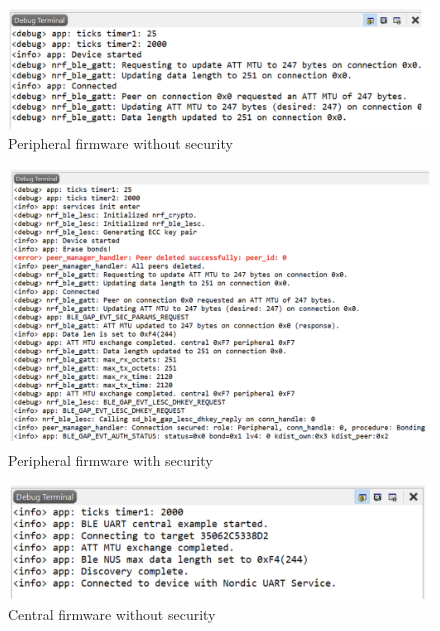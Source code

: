 \documentclass{Configuration_Files/PoliMi3i_thesis}
\begin{document}
\begin{figure}[h]
    \centering
    \includegraphics[scale=0.3]{Firmware_security/Screenshot 2024-07-22 at 22.33.24.png}
    \caption{Peripheral firmware without security}
    \label{firm_sec_2}
\end{figure}

\begin{figure}[h]
    \centering
    \includegraphics[scale=0.3]{Firmware_security/Screenshot 2024-07-22 at 22.33.31.png}
    \caption{Peripheral firmware with security}
    \label{firm_sec_3}
\end{figure}

\begin{figure}[h]
    \centering
    \includegraphics[scale=0.3]{Firmware_security/Screenshot 2024-07-22 at 22.33.37.png}
    \caption{Central firmware without security}
    \label{firm_sec_4}
\end{figure}
\end{document}
